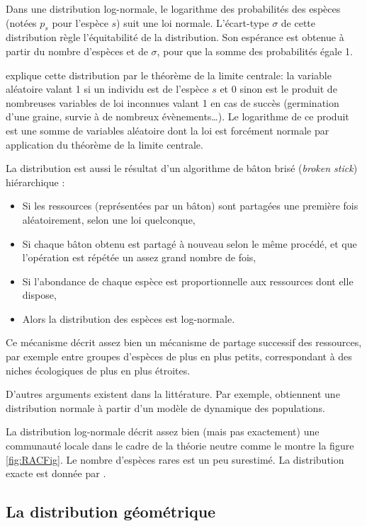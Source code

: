 \documentclass[
  11pt,
  american,
  a4paper,
  extrafontsizes,onecolumn,openright
  ]{memoir}
\providecommand{\tightlist}{%
  \setlength{\itemsep}{0pt}\setlength{\parskip}{0pt}}
\begin{document}
Dans une distribution log-normale, le logarithme des probabilités des espèces (notées \(p_s\) pour l'espèce \(s\)) suit une loi normale.
L'écart-type \(\sigma\) de cette distribution règle l'équitabilité de la distribution.
Son espérance est obtenue à partir du nombre d'espèces et de \(\sigma\), pour que la somme des probabilités égale 1.

\textcite{May1975} explique cette distribution par le théorème de la limite centrale: la variable aléatoire valant 1 si un individu est de l'espèce \(s\) et 0 sinon est le produit de nombreuses variables de loi inconnues valant 1 en cas de succès (germination d'une graine, survie à de nombreux évènements\ldots).
Le logarithme de ce produit est une somme de variables aléatoire dont la loi est forcément normale par application du théorème de la limite centrale.

La distribution est aussi le résultat d'un algorithme de bâton brisé (\emph{broken stick}) hiérarchique \autocite{Bulmer1974}:

\begin{itemize}
\tightlist
\item
  Si les ressources (représentées par un bâton) sont partagées une première fois aléatoirement, selon une loi quelconque,
\item
  Si chaque bâton obtenu est partagé à nouveau selon le même procédé, et que l'opération est répétée un assez grand nombre de fois,
\item
  Si l'abondance de chaque espèce est proportionnelle aux ressources dont elle dispose,
\item
  Alors la distribution des espèces est log-normale.
\end{itemize}

Ce mécanisme décrit assez bien un mécanisme de partage successif des ressources, par exemple entre groupes d'espèces de plus en plus petits, correspondant à des niches écologiques de plus en plus étroites.

D'autres arguments existent dans la littérature.
Par exemple, \textcite{Engen1996} obtiennent une distribution normale à partir d'un modèle de dynamique des populations.

La distribution log-normale décrit assez bien (mais pas exactement) une communauté locale dans le cadre de la théorie neutre \autocite{Hubbell2001} comme le montre la figure \ref{fig:RACFig}.
Le nombre d'espèces rares est un peu surestimé.
La distribution exacte est donnée par \textcite{Volkov2003}.

\hypertarget{la-distribution-guxe9omuxe9trique}{%
\subsection{La distribution géométrique}\label{la-distribution-guxe9omuxe9trique}}
\end{document}
